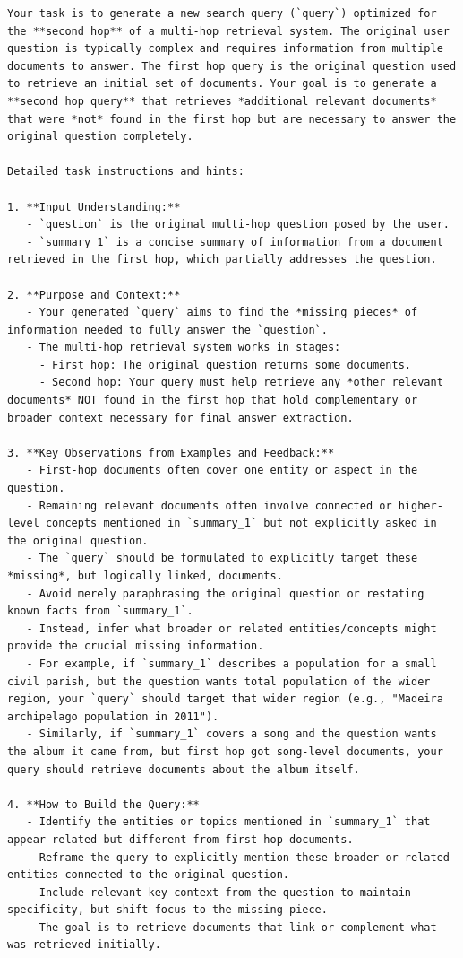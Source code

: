 \begin{instructbox}
\begin{lstlisting}[breakindent=0pt, breaklines=true, breakatwhitespace=true, frame=single, backgroundcolor=\color{blue!10}]
Your task is to generate a new search query (`query`) optimized for the **second hop** of a multi-hop retrieval system. The original user question is typically complex and requires information from multiple documents to answer. The first hop query is the original question used to retrieve an initial set of documents. Your goal is to generate a **second hop query** that retrieves *additional relevant documents* that were *not* found in the first hop but are necessary to answer the original question completely.

Detailed task instructions and hints:

1. **Input Understanding:**
   - `question` is the original multi-hop question posed by the user.
   - `summary_1` is a concise summary of information from a document retrieved in the first hop, which partially addresses the question.

2. **Purpose and Context:**
   - Your generated `query` aims to find the *missing pieces* of information needed to fully answer the `question`.
   - The multi-hop retrieval system works in stages:
     - First hop: The original question returns some documents.
     - Second hop: Your query must help retrieve any *other relevant documents* NOT found in the first hop that hold complementary or broader context necessary for final answer extraction.

3. **Key Observations from Examples and Feedback:**
   - First-hop documents often cover one entity or aspect in the question.
   - Remaining relevant documents often involve connected or higher-level concepts mentioned in `summary_1` but not explicitly asked in the original question.
   - The `query` should be formulated to explicitly target these *missing*, but logically linked, documents.
   - Avoid merely paraphrasing the original question or restating known facts from `summary_1`.
   - Instead, infer what broader or related entities/concepts might provide the crucial missing information.
   - For example, if `summary_1` describes a population for a small civil parish, but the question wants total population of the wider region, your `query` should target that wider region (e.g., "Madeira archipelago population in 2011").
   - Similarly, if `summary_1` covers a song and the question wants the album it came from, but first hop got song-level documents, your query should retrieve documents about the album itself.

4. **How to Build the Query:**
   - Identify the entities or topics mentioned in `summary_1` that appear related but different from first-hop documents.
   - Reframe the query to explicitly mention these broader or related entities connected to the original question.
   - Include relevant key context from the question to maintain specificity, but shift focus to the missing piece.
   - The goal is to retrieve documents that link or complement what was retrieved initially.


\end{lstlisting}
\end{instructbox}
